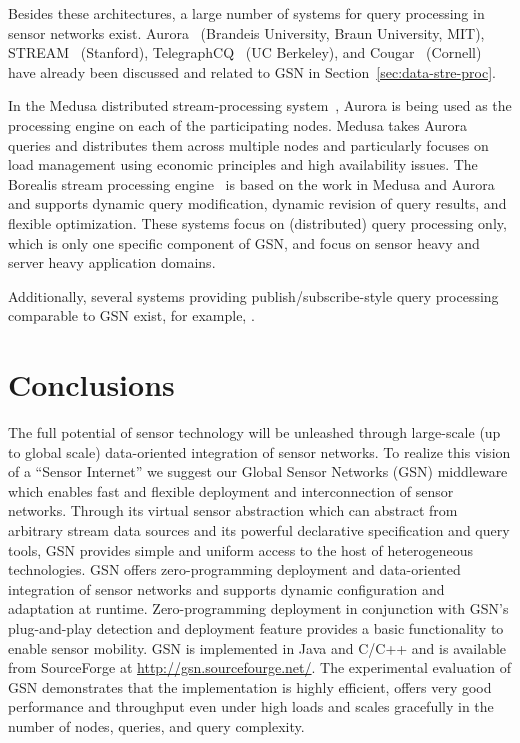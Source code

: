 Besides these architectures, a large number of systems for query processing in
sensor networks exist. Aurora~\cite{Cherniack03} (Brandeis University, Braun
University, MIT), STREAM~\cite{Arasu06} (Stanford),
TelegraphCQ~\cite{Chandrasekaran03} (UC Berkeley), and Cougar~\cite{Yao03}
(Cornell) have already been discussed and related to GSN in
Section~\ref{sec:data-stre-proc}.


In the Medusa distributed stream-processing system~\cite{Zdonik03}, Aurora is
being used as the processing engine on each of the participating nodes. Medusa
takes Aurora queries and distributes them across multiple nodes and
particularly focuses on load management using economic principles and high
availability issues. The Borealis stream processing engine~\cite{Abadi05} is
based on the work in Medusa and Aurora and supports dynamic query modification,
dynamic revision of query results, and flexible optimization. These systems
focus on (distributed) query processing only, which is only one specific
component of GSN, and focus on sensor heavy and server heavy application
domains.

Additionally, several systems providing publish/subscribe-style query
processing comparable to GSN exist, for example, \cite{Gray05}.

\section{Conclusions}
\label{sec:conclusions}

The full potential of sensor technology will be unleashed through large-scale
(up to global scale) data-oriented integration of sensor networks. To realize
this vision of a ``Sensor Internet'' we suggest our Global Sensor Networks
(GSN) middleware which enables fast and flexible deployment and interconnection
of sensor networks. Through its virtual sensor abstraction which can abstract
from arbitrary stream data sources and its powerful declarative specification
and query tools, GSN provides simple and uniform access to the host of
heterogeneous technologies. GSN offers zero-programming deployment and
data-oriented integration of sensor networks and supports dynamic configuration
and adaptation at runtime. Zero-programming deployment in conjunction with
GSN's plug-and-play detection and deployment feature provides a basic
functionality to enable sensor mobility. GSN is implemented in Java and C/C++
and is available from SourceForge at \url{http://gsn.sourcefourge.net/}.
The experimental evaluation of GSN demonstrates that the implementation is
highly efficient, offers very good performance and throughput even under high
loads and scales gracefully in the number of nodes, queries, and query
complexity.

